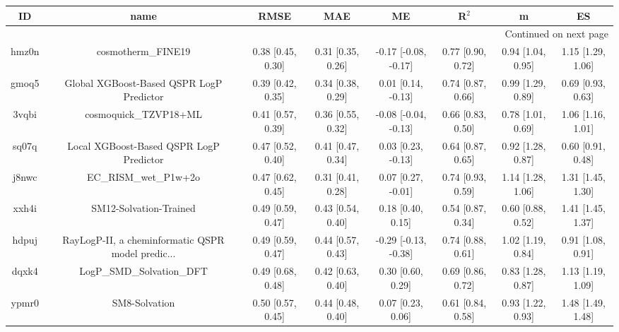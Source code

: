 \documentclass{article}
\begin{document}
\begin{center}
\begin{longtable}{|cccccccc|}
\toprule
    ID &                                               name &               RMSE &                MAE &                    ME &              R$^2$ &                     m &                    ES \\
\midrule
\endhead
\midrule
\multicolumn{8}{r}{{Continued on next page}} \\
\midrule
\endfoot

\bottomrule
\endlastfoot
 hmz0n &                                 cosmotherm\_FINE19 &  0.38 [0.45, 0.30] &  0.31 [0.35, 0.26] &  -0.17 [-0.08, -0.17] &  0.77 [0.90, 0.72] &     0.94 [1.04, 0.95] &     1.15 [1.29, 1.06] \\
 gmoq5 &           Global XGBoost-Based QSPR LogP Predictor &  0.39 [0.42, 0.35] &  0.34 [0.38, 0.29] &    0.01 [0.14, -0.13] &  0.74 [0.87, 0.66] &     0.99 [1.29, 0.89] &     0.69 [0.93, 0.63] \\
 3vqbi &                              cosmoquick\_TZVP18+ML &  0.41 [0.57, 0.39] &  0.36 [0.55, 0.32] &  -0.08 [-0.04, -0.13] &  0.66 [0.83, 0.50] &     0.78 [1.01, 0.69] &     1.06 [1.16, 1.01] \\
 sq07q &            Local XGBoost-Based QSPR LogP Predictor &  0.47 [0.52, 0.40] &  0.41 [0.47, 0.34] &    0.03 [0.23, -0.13] &  0.64 [0.87, 0.65] &     0.92 [1.28, 0.87] &     0.60 [0.91, 0.48] \\
 j8nwc &                              EC\_RISM\_wet\_P1w+2o &  0.47 [0.62, 0.45] &  0.31 [0.41, 0.28] &    0.07 [0.27, -0.01] &  0.74 [0.93, 0.59] &     1.14 [1.28, 1.06] &     1.31 [1.45, 1.30] \\
 xxh4i &                             SM12-Solvation-Trained &  0.49 [0.59, 0.47] &  0.43 [0.54, 0.40] &     0.18 [0.40, 0.15] &  0.54 [0.87, 0.34] &     0.60 [0.88, 0.52] &     1.41 [1.45, 1.37] \\
 hdpuj &  RayLogP-II, a cheminformatic QSPR model predic... &  0.49 [0.59, 0.47] &  0.44 [0.57, 0.43] &  -0.29 [-0.13, -0.38] &  0.74 [0.88, 0.61] &     1.02 [1.19, 0.84] &     0.91 [1.08, 0.91] \\
 dqxk4 &                          LogP\_SMD\_Solvation\_DFT &  0.49 [0.68, 0.48] &  0.42 [0.63, 0.40] &     0.30 [0.60, 0.29] &  0.69 [0.86, 0.72] &     0.83 [1.28, 0.87] &     1.13 [1.19, 1.09] \\
 ypmr0 &                                      SM8-Solvation &  0.50 [0.57, 0.45] &  0.44 [0.48, 0.40] &     0.07 [0.23, 0.06] &  0.61 [0.84, 0.58] &     0.93 [1.22, 0.93] &     1.48 [1.49, 1.48] \\

\end{longtable}
\end{center}
\end{document}
